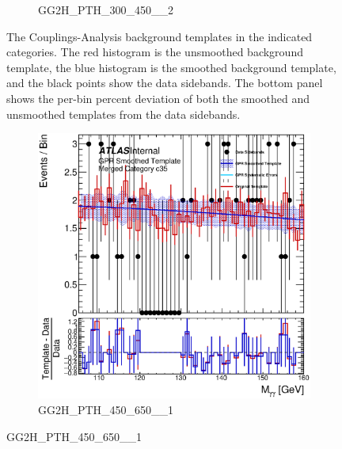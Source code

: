 \begin{figure}
\begin{center}
\begin{subfigure}[T]{0.49\linewidth}
	\caption{GG2H\_PTH\_300\_450\_\_2}
\end{subfigure}
	\caption{The Couplings-Analysis background templates in the indicated categories. The red histogram is the unsmoothed background template, the blue histogram is the smoothed background template, and the black points show the data sidebands. The bottom panel shows the per-bin percent deviation of both the smoothed and unsmoothed templates from the data sidebands. }
 \label{fig:gpr_coupcat_8}
 \end{center}
\end{figure}

\begin{figure}
\begin{center}
\begin{subfigure}[T]{0.49\linewidth}
	\centering
	\includegraphics[width=\linewidth]{figures/background/gpr/coupCatTemplates/GPR_Smoothed_Plot_hmgg_c35New.eps}
	\caption{GG2H\_PTH\_450\_650\_\_1}
\end{subfigure}

\end{center}
\end{figure}

